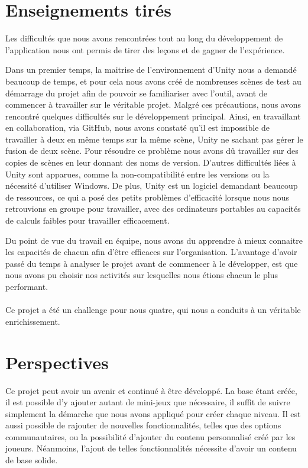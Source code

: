 \section{Enseignements tirés}
Les difficultés que nous avons rencontrées tout au long du développement de l'application nous ont permis de tirer des leçons et de gagner de l'expérience.

Dans un premier temps, la maitrise de l'environnement d'Unity nous a demandé beaucoup de temps, et pour cela nous avons créé de nombreuses scènes de test au démarrage du projet afin de pouvoir se familiariser avec l'outil, avant de commencer à travailler sur le véritable projet. Malgré ces précautions, nous avons rencontré quelques difficultés sur le développement principal. Ainsi, en travaillant en collaboration, via GitHub, nous avons constaté qu'il est impossible de travailler à deux en même temps sur la même scène, Unity ne sachant pas gérer le fusion de deux scène. Pour résoudre ce problème nous avons dû travailler sur des copies de scènes en leur donnant des noms de version. D'autres difficultés liées à Unity sont apparues, comme la non-compatibilité entre les versions ou la nécessité d'utiliser Windows. De plus, Unity est un logiciel demandant beaucoup de ressources, ce qui a posé des petits problèmes d'efficacité lorsque nous nous retrouvions en groupe pour travailler, avec des ordinateurs portables au capacités de calculs faibles pour travailler efficacement.

Du point de vue du travail en équipe, nous avons du apprendre à mieux connaitre les capacités de chacun afin d'être efficaces sur l'organisation. L'avantage d'avoir passé du temps à analyser le projet avant de commencer à le développer, est que nous avons pu choisir nos activités sur lesquelles nous étions chacun le plus performant.

\paragraph{}
Ce projet a été un challenge pour nous quatre, qui nous a conduits à un véritable enrichissement.


\section{Perspectives}
Ce projet peut avoir un avenir et continué à être développé. La base étant créée, il est possible d'y ajouter autant de mini-jeux que nécessaire, il suffit de suivre simplement la démarche que nous avons appliqué pour créer chaque niveau. Il est aussi possible de rajouter de nouvelles fonctionnalités, telles que des options communautaires, ou la possibilité d'ajouter du contenu personnalisé créé par les joueurs. Néanmoins, l'ajout de telles fonctionnalités nécessite d'avoir un contenu de base solide.

